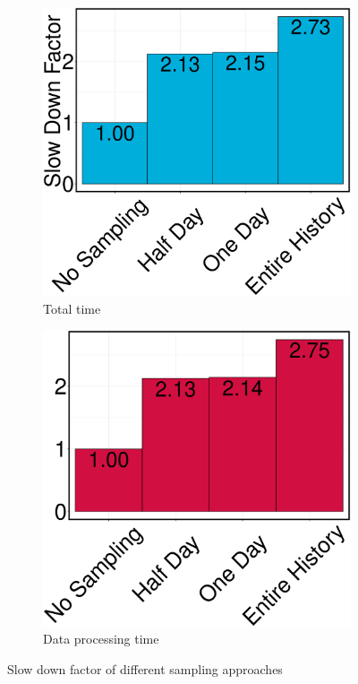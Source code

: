 \begin{figure}[h]
\begin{subfigure}{\columnwidth/2}
\centering
\includegraphics[width=\columnwidth]{../images/experiment-results/criteo-sampling-total-experiment.eps}
\caption{Total time}
\label{fig:sampling-mode-total-time}
\end{subfigure}%
\begin{subfigure}{\columnwidth/2}
\centering
\includegraphics[width=\columnwidth]{../images/experiment-results/criteo-sampling-data-experiment.eps}
\caption{Data processing time}
\label{fig:sampling-mode-data-time}
\end{subfigure}
\vspace{2mm}
\caption{Slow down factor of different sampling approaches}
\label{fig:sampling-mode-time}
\end{figure}

